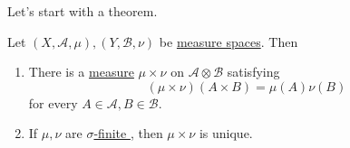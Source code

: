 Let's start with a theorem.
\begin{theorem}
	Let \((X, \mathcal{A} , \mu ), (Y, \mathcal{B} , \nu )\) be \hyperref[def:measure-space]{measure spaces}. Then
	\begin{enumerate}[(1)]
		\item There is a \hyperref[def:measure]{measure} \(\mu \times \nu \) on \(\mathcal{A} \otimes \mathcal{B} \) satisfying
		      \[
			      (\mu \times \nu )(A\times B) = \mu (A)\nu (B)
		      \]
		      for every \(A\in \mathcal{A} , B\in \mathcal{B} \).
		\item If \(\mu , \nu \) are \hyperref[def:sigma-finite-measure]{\(\sigma\)-finite }, then \(\mu \times \nu \) is unique.
	\end{enumerate}
\end{theorem}
